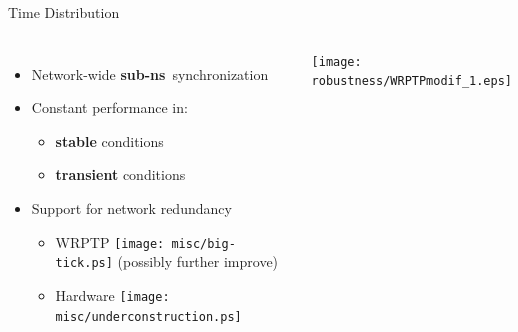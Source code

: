 \documentclass[compress,red]{beamer}
\begin{document}
\begin{frame}{Time Distribution}

  \begin{columns}[c]

  \begin{itemize}
    \item Network-wide {\bf sub-ns}~synchronization
    \vspace{0.3cm}
    \item Constant performance in:
	\begin{itemize}
	  \item {\bf stable} conditions
	  \item {\bf transient} conditions
	\end{itemize}
    \vspace{0.3cm}
    \item Support for network redundancy
    \begin{itemize}
      \item WRPTP \texttt{[image: misc/big-tick.ps]}  (possibly further improve)
      \item Hardware \texttt{[image: misc/underconstruction.ps]}
    \end{itemize}
  \end{itemize}


      \begin{center}
	\texttt{[image: robustness/WRPTPmodif\_1.eps]}
      \end{center}  
    

  \end{columns}

\end{frame}
\end{document}
